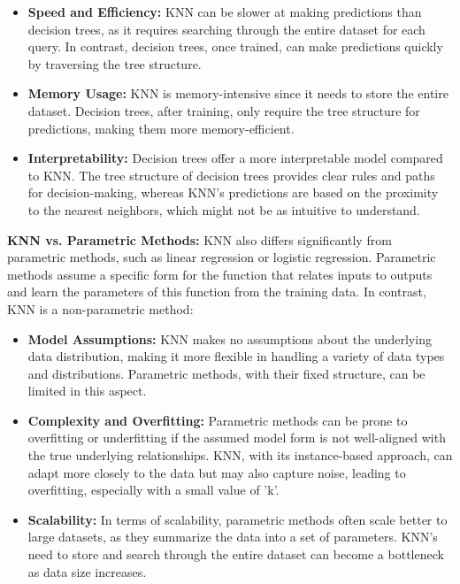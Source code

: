 \documentclass[letterpaper,10pt]{article}
\begin{document}
\begin{itemize}
    \item \textbf{Speed and Efficiency:} KNN can be slower at making predictions than decision trees, as it requires searching through the entire dataset for each query. In contrast, decision trees, once trained, can make predictions quickly by traversing the tree structure.
    \item \textbf{Memory Usage:} KNN is memory-intensive since it needs to store the entire dataset. Decision trees, after training, only require the tree structure for predictions, making them more memory-efficient.
    \item \textbf{Interpretability:} Decision trees offer a more interpretable model compared to KNN. The tree structure of decision trees provides clear rules and paths for decision-making, whereas KNN's predictions are based on the proximity to the nearest neighbors, which might not be as intuitive to understand.
\end{itemize}

\textbf{KNN vs. Parametric Methods:} KNN also differs significantly from parametric methods, such as linear regression or logistic regression. Parametric methods assume a specific form for the function that relates inputs to outputs and learn the parameters of this function from the training data. In contrast, KNN is a non-parametric method:

\begin{itemize}
    \item \textbf{Model Assumptions:} KNN makes no assumptions about the underlying data distribution, making it more flexible in handling a variety of data types and distributions. Parametric methods, with their fixed structure, can be limited in this aspect.
    \item \textbf{Complexity and Overfitting:} Parametric methods can be prone to overfitting or underfitting if the assumed model form is not well-aligned with the true underlying relationships. KNN, with its instance-based approach, can adapt more closely to the data but may also capture noise, leading to overfitting, especially with a small value of 'k'.
    \item \textbf{Scalability:} In terms of scalability, parametric methods often scale better to large datasets, as they summarize the data into a set of parameters. KNN's need to store and search through the entire dataset can become a bottleneck as data size increases.
\end{itemize}
\end{document}
